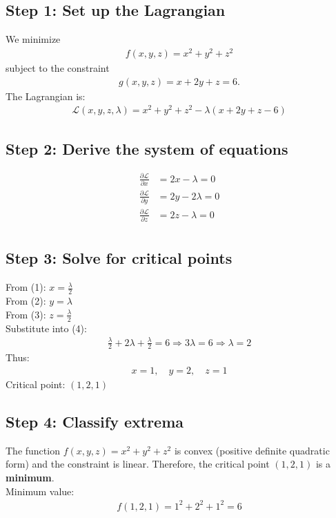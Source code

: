 \documentclass[12pt, xcolor=dvipsnames,svgnames,x11names]{article}
\begin{document}
\begin{answerbox}

\subsection*{Step 1: Set up the Lagrangian}
We minimize 
\begin{align*}
f(x, y, z) = x^2 + y^2 + z^2
\end{align*}
subject to the constraint 
\begin{align*}
g(x, y, z) = x + 2y + z = 6.
\end{align*}
The Lagrangian is:
\begin{align*}
\mathcal{L}(x, y, z, \lambda) = x^2 + y^2 + z^2 - \lambda(x + 2y + z - 6)
\end{align*}

\subsection*{Step 2: Derive the system of equations}
\begin{align*}
\frac{\partial \mathcal{L}}{\partial x} &= 2x - \lambda = 0  \\
\frac{\partial \mathcal{L}}{\partial y} &= 2y - 2\lambda = 0 \\
\frac{\partial \mathcal{L}}{\partial z} &= 2z - \lambda = 0  \\
\end{align*}

\subsection*{Step 3: Solve for critical points}
From (1): $x = \frac{\lambda}{2}$ \\
From (2): $y = \lambda$ \\
From (3): $z = \frac{\lambda}{2}$ \\
Substitute into (4):
\begin{align*}
\frac{\lambda}{2} + 2\lambda + \frac{\lambda}{2} = 6 \Rightarrow 3\lambda = 6 \Rightarrow \lambda = 2
\end{align*}
Thus:
\begin{align*}
x = 1, \quad y = 2, \quad z = 1
\end{align*}
Critical point: $(1, 2, 1)$

\subsection*{Step 4: Classify extrema}
The function $f(x, y, z) = x^2 + y^2 + z^2$ is convex (positive definite quadratic form) and the constraint is linear. Therefore, the critical point $(1, 2, 1)$ is a \textbf{minimum}. \\
Minimum value:
\begin{align*}
f(1, 2, 1) = 1^2 + 2^2 + 1^2 = 6
\end{align*}


\end{answerbox}
\end{document}
